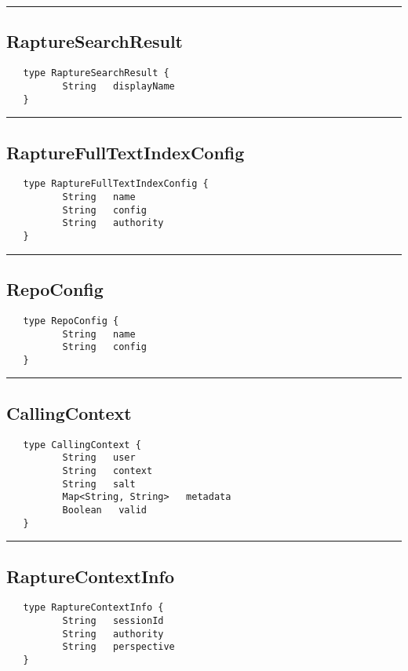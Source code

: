 \rule{15cm}{2pt}
\subsection{RaptureSearchResult}
\label{type:RaptureSearchResult}

\begin{verbatim}
   type RaptureSearchResult {
          String   displayName
   }
\end{verbatim}

\rule{15cm}{2pt}
\subsection{RaptureFullTextIndexConfig}
\label{type:RaptureFullTextIndexConfig}

\begin{verbatim}
   type RaptureFullTextIndexConfig {
          String   name
          String   config
          String   authority
   }
\end{verbatim}

\rule{15cm}{2pt}
\subsection{RepoConfig}
\label{type:RepoConfig}

\begin{verbatim}
   type RepoConfig {
          String   name
          String   config
   }
\end{verbatim}

\rule{15cm}{2pt}
\subsection{CallingContext}
\label{type:CallingContext}

\begin{verbatim}
   type CallingContext {
          String   user
          String   context
          String   salt
          Map<String, String>   metadata
          Boolean   valid
   }
\end{verbatim}

\rule{15cm}{2pt}
\subsection{RaptureContextInfo}
\label{type:RaptureContextInfo}

\begin{verbatim}
   type RaptureContextInfo {
          String   sessionId
          String   authority
          String   perspective
   }
\end{verbatim}

